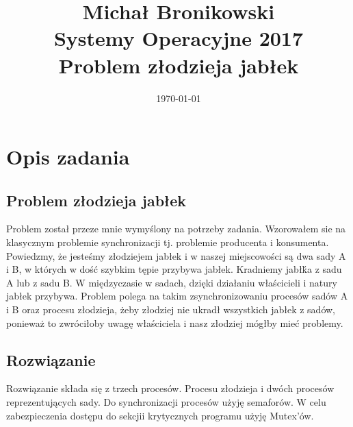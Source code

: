 \documentclass{article}
\title{Michał Bronikowski\protect \\ \hfill \newline \newline Systemy Operacyjne 2017\\ Problem złodzieja jabłek\\ } %
\date{\today} %
\begin{document}
\maketitle  %
\newpage
\tableofcontents
\newpage

\section{Opis zadania}

\subsection{Problem złodzieja jabłek}
Problem został przeze mnie wymyślony na potrzeby zadania. Wzorowałem sie na klasycznym problemie synchronizacji tj. problemie producenta i konsumenta. Powiedzmy, że jesteśmy złodziejem jabłek i w naszej miejscowości są dwa sady A i B, w których w dość szybkim tępie przybywa jabłek. Kradniemy jabłḱa z sadu A lub z sadu B. W międzyczasie w sadach, dzięki działaniu właścicieli i natury jabłek przybywa. Problem polega na takim zsynchronizowaniu procesów sadów A i B oraz procesu złodzieja, żeby złodziej nie ukradł wszystkich jabłek z sadów, ponieważ to zwróciłoby uwagę właściciela i nasz złodziej mógłby mieć problemy.
\subsection{Rozwiązanie}
Rozwiązanie składa się z trzech procesów. Procesu złodzieja i dwóch procesów reprezentujących sady. 
Do synchronizacji procesów użyję semaforów. W celu zabezpieczenia dostępu do sekcjii krytycznych programu użyję Mutex'ów.
\end{document}
